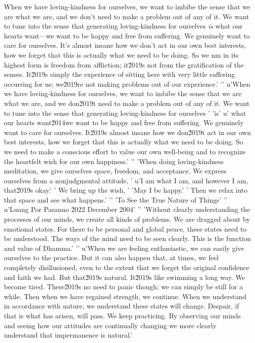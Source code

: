When we have loving-kindness for ourselves, we want to imbibe the sense 
that we are what we are, and we don't need to make a problem out of any 
of it. We want to tune into the sense that generating loving-kindness 
for ourselves \emph{is} what our hearts want---we want to be happy and 
free from suffering. We genuinely want to care for ourselves. It's 
almost insane how we don't act in our own best interests, how we forget 
that this is actually what we need to be doing. So we nm in its highest form is freedom from affliction; it\u2019s not from the gratification of the senses. It\u2019s simply the experience of sitting here with very little suffering occurring for us; we\u2019re not making problems out of our experience.'
'\n'
u'When we have loving-kindness for ourselves, we want to imbibe the sense that we are what we are, and we don\u2019t need to make a problem out of any of it. We want to tune into the sense that generating loving-kindness for ourselves '
'is'
u' what our hearts want\u2014we want to be happy and free from suffering. We genuinely want to care for ourselves. It\u2019s almost insane how we don\u2019t act in our own best interests, how we forget that this is actually what we need to be doing. So we need to make a conscious effort to value our own well-being and to recognize the heartfelt wish for our own happiness.'
'\n'
'When doing loving-kindness meditation, we give ourselves space, freedom, and acceptance. We express ourselves from a nonjudgmental attitude, '
u'I am what I am, and however I am, that\u2019s okay.'
' We bring up the wish, '
'May I be happy.'
' Then we relax into that space and see what happens.'
'\n'
'To See the True Nature of Things'
'\n'
u'Luang Por Pasanno \u2022 December 2004'
'\n'
'Without clearly understanding the processes of our minds, we create all kinds of problems. We are dragged about by emotional states. For there to be personal and global peace, these states need to be understood. The ways of the mind need to be seen clearly. This is the function and value of Dhamma.'
'\n'
u'When we are feeling enthusiastic, we can easily give ourselves to the practice. But it can also happen that, at times, we feel completely disillusioned, even to the extent that we forget the original confidence and faith we had. But that\u2019s natural. It\u2019s like swimming a long way. We become tired. There\u2019s no need to panic though; we can simply be still for a while. Then when we have regained strength, we continue. When we understand in accordance with nature, we understand these states will change. Despair, if that is what has arisen, will pass. We keep practicing. By observing our minds and seeing how our attitudes are continually changing we more clearly understand that impermanence is natural.'
